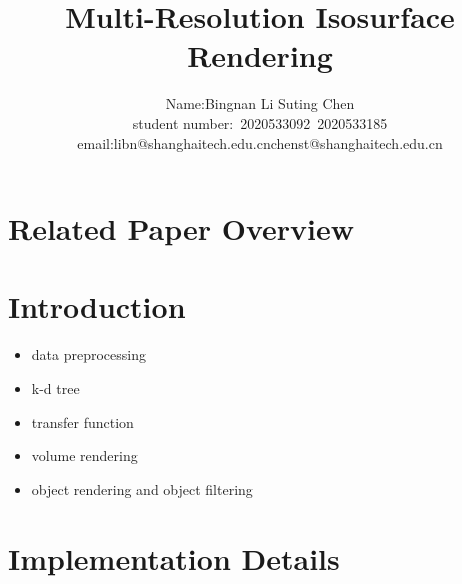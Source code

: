\documentclass[acmtog]{acmart}
\title{Multi-Resolution Isosurface Rendering}
\author{Name:\quad Bingnan Li \quad Suting Chen \\ student number:\ 2020533092\ 2020533185
\\email:\quad libn@shanghaitech.edu.cn\quad chenst@shanghaitech.edu.cn}
\begin{document}
    \maketitle

    \vspace*{2 ex}


    \section{Related Paper Overview}\label{sec:related-paper-overview}


    \section{Introduction}\label{sec:introduction}
    \begin{itemize}
        \item data preprocessing
        \item k-d tree
        \item transfer function
        \item volume rendering
        \item object rendering and object filtering
    \end{itemize}


    \section{Implementation Details}\label{sec:implementation-details}
\end{document}
